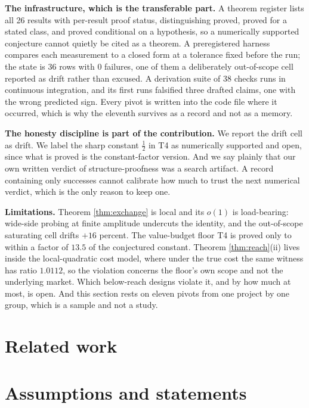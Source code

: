 \documentclass{article}
\begin{document}
\textbf{The infrastructure, which is the transferable part.} A theorem
register lists all 26 results with per-result proof status, distinguishing
proved, proved for a stated class, and proved conditional on a hypothesis, so
a numerically supported conjecture cannot quietly be cited as a theorem. A
preregistered harness compares each measurement to a closed form at a
tolerance fixed before the run; the state is 36 rows with 0 failures, one of
them a deliberately out-of-scope cell reported as drift rather than excused.
A derivation suite of 38 checks runs in continuous integration, and its first
runs falsified three drafted claims, one with the wrong predicted sign. Every
pivot is written into the code file where it occurred, which is why the
eleventh survives as a record and not as a memory.

\textbf{The honesty discipline is part of the contribution.} We report the
drift cell as drift. We label the sharp constant $\tfrac12$ in T4 as
numerically supported and open, since what is proved is the constant-factor
version. And we say plainly that our own written verdict of
structure-proofness was a search artifact. A record containing only successes
cannot calibrate how much to trust the next numerical verdict, which is the
only reason to keep one.

\textbf{Limitations.}\label{sec:limits} Theorem \ref{thm:exchange} is local
and its $o(1)$ is load-bearing: wide-side probing at finite amplitude
undercuts the identity, and the out-of-scope saturating cell drifts $+16$
percent. The value-budget floor T4 is proved only to within a factor of
$13.5$ of the conjectured constant. Theorem \ref{thm:reach}(ii) lives inside
the local-quadratic cost model, where under the true cost the same witness
has ratio $1.0112$, so the violation concerns the floor's own scope and not
the underlying market. Which below-reach designs violate it, and by how much
at most, is open. And this section rests on eleven pivots from one project by
one group, which is a sample and not a study.




\clearpage
\appendix

\section{Related work}
\label{app:related}


\clearpage
\section{Assumptions and statements}
\label{app:statements}

\end{document}
